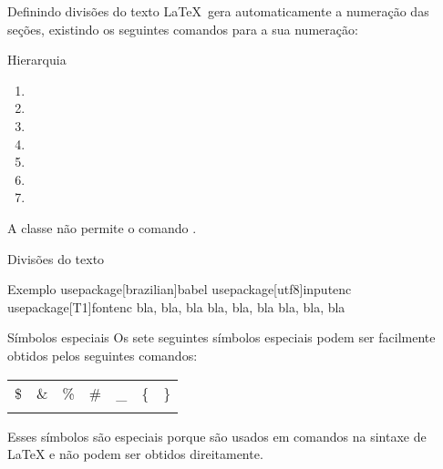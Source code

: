 \begin{frame}{Definindo divisões do texto}
	\LaTeX\ gera automaticamente a numeração das seções, existindo os seguintes comandos para a sua numeração:
	\pause
	\begin{Resultado}{Hierarquia}
		\begin{enumerate}
			\item {}
			\item {}
			\item {}
			\item {}
			\item {}
			\item {}
			\item {}
		\end{enumerate}

	\end{Resultado}

	\pause
	\begin{Observacao}{}
		A classe  não permite o comando .
	\end{Observacao}
\end{frame}

\begin{frame}{Divisões do texto}
	\begin{Codigo}{Exemplo}
		\n
		\LOA usepackage[brazilian]{babel} \LOA usepackage[utf8]{inputenc}\n
		\LOA usepackage[T1]{fontenc} \n
		\n
		\n
			bla, bla, bla\n
		\n
		\n
			bla, bla, bla\n
		\n
		\n
			bla, bla, bla\n
	\end{Codigo}
\end{frame}

\begin{frame}{Símbolos especiais}
	Os sete seguintes símbolos especiais podem ser facilmente obtidos pelos seguintes comandos:

	\pause
	\begin{center}
		\begin{tabular}{r*6c}
			\$ &\& &\% &\# &\_ &\{ &\} \\
			\LCmd{\$} &\LCmd{\&} &\LCmd{\%} &\LCmd{\#} &\LCmd{\textunderscore} &\LCmd{\lb} &\LCmd{\rb}
		\end{tabular}
	\end{center}

		\pause
		Esses símbolos são especiais porque são usados em comandos na sintaxe de \LaTeX{} e não podem ser obtidos direitamente.
\end{frame}

